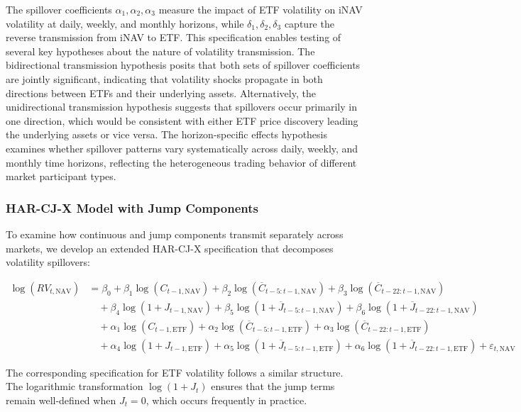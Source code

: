The spillover coefficients $\alpha_1, \alpha_2, \alpha_3$ measure the impact of ETF volatility on iNAV volatility at daily, weekly, and monthly horizons, while $\delta_1, \delta_2, \delta_3$ capture the reverse transmission from iNAV to ETF. This specification enables testing of several key hypotheses about the nature of volatility transmission. The bidirectional transmission hypothesis posits that both sets of spillover coefficients are jointly significant, indicating that volatility shocks propagate in both directions between ETFs and their underlying assets. Alternatively, the unidirectional transmission hypothesis suggests that spillovers occur primarily in one direction, which would be consistent with either ETF price discovery leading the underlying assets or vice versa. The horizon-specific effects hypothesis examines whether spillover patterns vary systematically across daily, weekly, and monthly time horizons, reflecting the heterogeneous trading behavior of different market participant types.

\subsubsection{HAR-CJ-X Model with Jump Components}

To examine how continuous and jump components transmit separately across markets, we develop an extended HAR-CJ-X specification that decomposes volatility spillovers:

\begin{align} \label{eq:har_cj_x_nav}
\log(RV_{t,\text{NAV}}) &= \beta_0 + \beta_1 \log(C_{t-1,\text{NAV}}) + \beta_2 \log(\overline{C}_{t-5:t-1,\text{NAV}}) + \beta_3 \log(\overline{C}_{t-22:t-1,\text{NAV}}) \\
&\quad + \beta_4 \log(1+J_{t-1,\text{NAV}}) + \beta_5 \log(1+\overline{J}_{t-5:t-1,\text{NAV}}) + \beta_6 \log(1+\overline{J}_{t-22:t-1,\text{NAV}}) \nonumber \\
&\quad + \alpha_1 \log(C_{t-1,\text{ETF}}) + \alpha_2 \log(\overline{C}_{t-5:t-1,\text{ETF}}) + \alpha_3 \log(\overline{C}_{t-22:t-1,\text{ETF}}) \nonumber \\
&\quad + \alpha_4 \log(1+J_{t-1,\text{ETF}}) + \alpha_5 \log(1+\overline{J}_{t-5:t-1,\text{ETF}}) + \alpha_6 \log(1+\overline{J}_{t-22:t-1,\text{ETF}}) + \varepsilon_{t,\text{NAV}} \nonumber
\end{align}

The corresponding specification for ETF volatility follows a similar structure. The logarithmic transformation $\log(1+J_{t})$ ensures that the jump terms remain well-defined when $J_{t} = 0$, which occurs frequently in practice.

